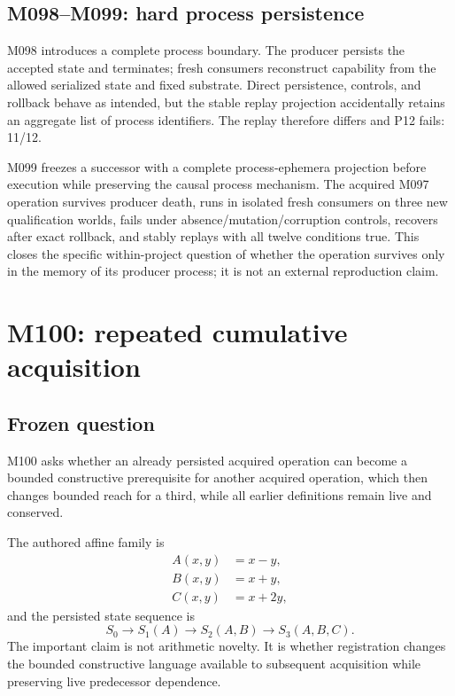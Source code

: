 \documentclass[10pt]{article}
\begin{document}
\subsection{M098--M099: hard process persistence}
M098 introduces a complete process boundary. The producer persists the accepted state and terminates; fresh consumers reconstruct capability from the allowed serialized state and fixed substrate. Direct persistence, controls, and rollback behave as intended, but the stable replay projection accidentally retains an aggregate list of process identifiers. The replay therefore differs and P12 fails: 11/12.

M099 freezes a successor with a complete process-ephemera projection before execution while preserving the causal process mechanism. The acquired M097 operation survives producer death, runs in isolated fresh consumers on three new qualification worlds, fails under absence/mutation/corruption controls, recovers after exact rollback, and stably replays with all twelve conditions true. This closes the specific within-project question of whether the operation survives only in the memory of its producer process; it is not an external reproduction claim.

\section{M100: repeated cumulative acquisition}
\subsection{Frozen question}
M100 asks whether an already persisted acquired operation can become a bounded constructive prerequisite for another acquired operation, which then changes bounded reach for a third, while all earlier definitions remain live and conserved.

The authored affine family is
\begin{align}
A(x,y) &= x-y,\\
B(x,y) &= x+y,\\
C(x,y) &= x+2y,
\end{align}
and the persisted state sequence is
\begin{equation}
S_0 \rightarrow S_1(A) \rightarrow S_2(A,B) \rightarrow S_3(A,B,C).
\end{equation}
The important claim is not arithmetic novelty. It is whether registration changes the bounded constructive language available to subsequent acquisition while preserving live predecessor dependence.
\end{document}
